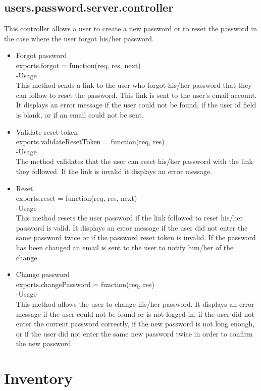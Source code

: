 \documentclass[a4paper,12pt]{article}
\begin{document}
 \subsection{users.password.server.controller}
 This controller allows a user to create a new password or to reset the password in the case where the user forgot his/her password.
 \begin{itemize}
 \item Forgot password\\
 exports.forgot = function(req, res, next)\\
 -Usage\\
 This method sends a link to the user who forgot his/her password that they can follow to reset the password. This link is sent to the user's email account. It displays an error message if the user could not be found, if the user id field is blank, or if an email could not be sent.
 \item Validate reset token\\
 exports.validateResetToken = function(req, res)\\
 -Usage\\
 The method validates that the user can reset his/her password with the link they followed. If the link is invalid it displays an error message.\\
 \item Reset\\
 exports.reset = function(req, res, next)\\
 -Usage\\
 This method resets the user password if the link followed to reset his/her password is valid. It displays an error message if the user did not enter the same password twice or if the password reset token is invalid. If the password has been changed an email is sent to the user to notify him/her of the change.
 \item Change password\\
 exports.changePassword = function(req, res)\\
 -Usage\\
 This method allows the user to change his/her password. It displays an error message if the user could not be found or is not logged in, if the user did not enter the current password correctly, if the new password is not long enough, or if the user did not enter the same new password twice in order to confirm the new password.
 \end{itemize}
 \section{Inventory}
\end{document}

